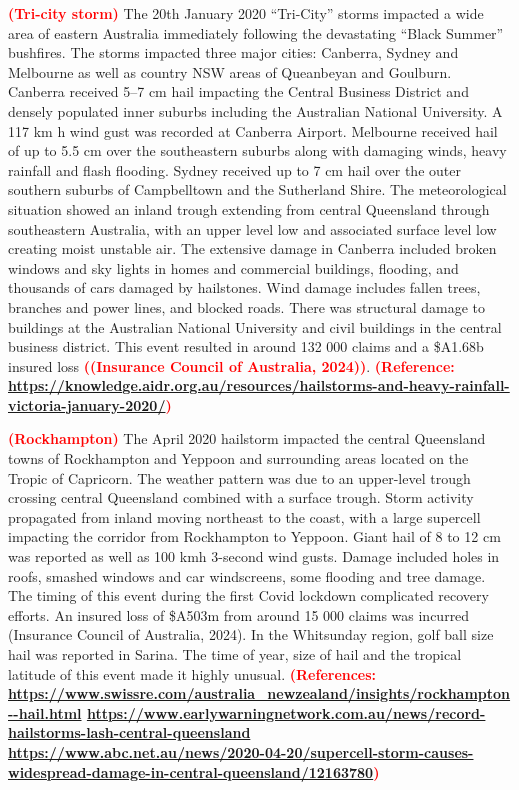 \documentclass[]{agujournal2019}\usepackage[]{graphicx}\usepackage[]{xcolor}
\newcommand*{\todo}[1]{\textbf{\textcolor{red}{(#1)}}}
\begin{document}
\todo{Tri-city storm} The 20th January 2020 ``Tri-City'' storms impacted a wide
area of eastern Australia immediately following the devastating ``Black Summer''
bushfires. The storms impacted three major cities: Canberra, Sydney and
Melbourne as well as country NSW areas of Queanbeyan and Goulburn. Canberra
received 5–7 cm hail impacting the Central Business District and densely
populated inner suburbs including the Australian National University. A 117 km h
wind gust was recorded at Canberra Airport. Melbourne received hail of up to 5.5
cm over the southeastern suburbs along with damaging winds, heavy rainfall and
flash flooding. Sydney received up to 7 cm hail over the outer southern suburbs
of Campbelltown and the Sutherland Shire. The meteorological situation showed an
inland trough extending from central Queensland through southeastern Australia,
with an upper level low and associated surface level low creating moist unstable
air. The extensive damage in Canberra included broken windows and sky lights in
homes and commercial buildings, flooding, and thousands of cars damaged by
hailstones.  Wind damage includes fallen trees, branches and power lines, and
blocked roads. There was structural damage to buildings at the Australian
National University and civil buildings in the central business district. This
event resulted in around 132 000 claims and a \$A1.68b insured loss
\todo{(Insurance Council of Australia, 2024)}. \todo{Reference:
\url{https://knowledge.aidr.org.au/resources/hailstorms-and-heavy-rainfall-victoria-january-2020/}}

\todo{Rockhampton} The April 2020 hailstorm impacted the central Queensland
towns of Rockhampton and Yeppoon and surrounding areas located on the Tropic of
Capricorn. The weather pattern was due to an upper-level trough crossing central
Queensland combined with a surface trough. Storm activity propagated from inland
moving northeast to the coast, with a large supercell impacting the corridor
from Rockhampton to Yeppoon. Giant hail of 8 to 12 cm was reported as well as
100 kmh 3-second wind gusts. Damage included holes in roofs, smashed windows and
car windscreens, some flooding and tree damage. The timing of this event during
the first Covid lockdown complicated recovery efforts. An insured loss of
\$A503m from around 15 000 claims was incurred (Insurance Council of Australia,
2024). In the Whitsunday region, golf ball size hail was reported in Sarina. The
time of year, size of hail and the tropical latitude of this event made it
highly unusual. \todo{References:
\url{https://www.swissre.com/australia_newzealand/insights/rockhampton--hail.html}
\url{https://www.earlywarningnetwork.com.au/news/record-hailstorms-lash-central-queensland}
\url{https://www.abc.net.au/news/2020-04-20/supercell-storm-causes-widespread-damage-in-central-queensland/12163780}}
\end{document}
